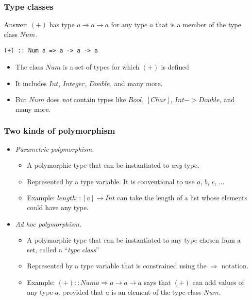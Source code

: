 \documentclass{beamer}
\begin{document}
\begin{frame}[fragile]
\frametitle{Type classes}

Answer: $(+)$ has type $a \rightarrow a \rightarrow a$ for any type $a$ that is a
member of the type class $Num$.

\begin{verbatim}
(+) :: Num a => a -> a -> a
\end{verbatim}

\begin{itemize}
\item The class $Num$ is a set of types for which $(+)$ is defined
\item It includes $Int$, $Integer$, $Double$, and many more.
\item But $Num$ does \emph{not} contain types like $Bool$,
  $[Char]$, $Int->Double$, and many more.
\end{itemize}

\end{frame}

\begin{frame}[fragile]
\frametitle{Two kinds of polymorphism}

\begin{itemize}
\item \emph{Parametric polymorphism.}
  \begin{itemize}
  \item A polymorphic type that can be instantiated to \emph{any}
    type.
  \item Represented by a type variable.  It is conventional to use
    $a$, $b$, $c$, $\ldots$
  \item Example: $length :: [a] \rightarrow Int$ can take the length of a
    list whose elements could have any type.
  \end{itemize}

\item \emph{Ad hoc polymorphism.}
  \begin{itemize}
  \item A polymorphic type that can be instantiated to any type
    chosen from a set, called a ``\emph{type class}''
  \item Represented by a type variable that is constrained using
    the $\Rightarrow$ notation.
  \item Example: $(+) :: Num a \Rightarrow a \rightarrow a \rightarrow a$ says that $(+)$ can
    add values of any type $a$, provided that $a$ is an element of
    the type class $Num$.
  \end{itemize}
\end{itemize}

\end{frame}
\end{document}
